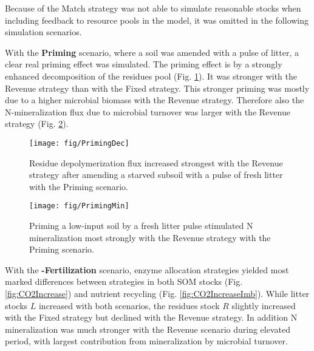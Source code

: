 Because of the Match strategy was not able to simulate reasonable
stocks when including feedback to resource pools in the model, it was omitted
in the following simulation scenarios.

With the \textbf{Priming} scenario, where a soil was amended with a pulse of
litter, a clear real priming effect was simulated.
The priming effect is by a strongly enhanced decomposition of the residues
pool (Fig. \ref{fig:PrimingDec}). It was stronger with the Revenue strategy than
with the Fixed strategy. This stronger priming was mostly due to a higher microbial
biomass with the Revenue strategy. Therefore also the N-mineralization flux due
to microbial turnover was larger with the Revenue strategy (Fig.
\ref{fig:PrimingMin}).

\begin{figure}[t]
\vspace*{2mm}
\begin{center}
\texttt{[image: fig/PrimingDec]}
\end{center}
\caption{Residue depolymerization flux increased strongest with the Revenue
strategy after amending a starved subsoil with a pulse of fresh litter with the
Priming scenario.
\label{fig:PrimingDec}}
\end{figure}

\begin{figure}[t]
\vspace*{2mm}
\begin{center}
\texttt{[image: fig/PrimingMin]}
\end{center}
\caption{Priming a low-input soil by a fresh litter pulse stimulated N
mineralization most strongly with the Revenue strategy with the Priming scenario.
\label{fig:PrimingMin}}
\end{figure}

With the \textbf{-Fertilization} scenario, enzyme allocation strategies
yielded most marked differences between strategies in both SOM stocks (Fig.
\ref{fig:CO2Increase}) and nutrient recycling (Fig. \ref{fig:CO2IncreaseImb}).
While litter stocks $L$ increased with both scenarios, the residues stock $R$
slightly increased with the Fixed strategy but declined with the Revenue strategy. In
addition N mineralization was much stronger with the Revenue scenario during
elevated  period, with largest contribution from mineralization by
microbial turnover.

